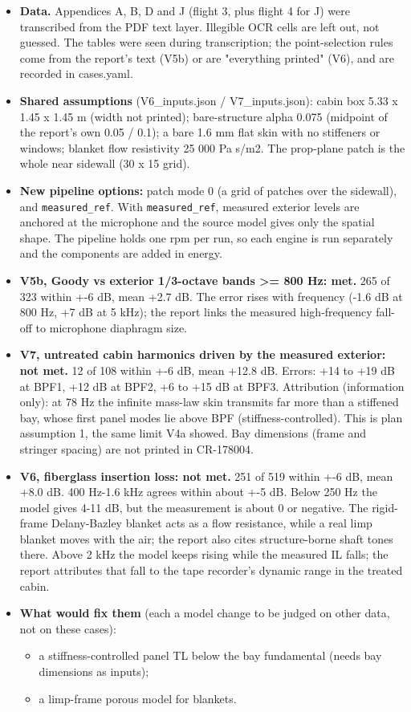\documentclass[10pt,a4paper]{article}
\begin{document}
\begin{itemize}
\item \textbf{Data.} Appendices A, B, D and J (flight 3, plus flight 4 for J) were transcribed from the PDF text layer. Illegible OCR cells are left out, not guessed. The tables were seen during transcription; the point-selection rules come from the report's text (V5b) or are "everything printed" (V6), and are recorded in cases.yaml.
\item \textbf{Shared assumptions} (V6\_inputs.json / V7\_inputs.json): cabin box 5.33 x 1.45 x 1.45 m (width not printed); bare-structure alpha 0.075 (midpoint of the report's own 0.05 / 0.1); a bare 1.6 mm flat skin with no stiffeners or windows; blanket flow resistivity 25 000 Pa s/m2. The prop-plane patch is the whole near sidewall (30 x 15 grid).
\item \textbf{New pipeline options:} patch mode 0 (a grid of patches over the sidewall), and \texttt{measured\_\allowbreak{}ref}. With \texttt{measured\_\allowbreak{}ref}, measured exterior levels are anchored at the microphone and the source model gives only the spatial shape. The pipeline holds one rpm per run, so each engine is run separately and the components are added in energy.
\item \textbf{V5b, Goody vs exterior 1/3-octave bands >= 800 Hz: met.} 265 of 323 within +-6 dB, mean +2.7 dB. The error rises with frequency (-1.6 dB at 800 Hz, +7 dB at 5 kHz); the report links the measured high-frequency fall-off to microphone diaphragm size.
\item \textbf{V7, untreated cabin harmonics driven by the measured exterior: not met.} 12 of 108 within +-6 dB, mean +12.8 dB. Errors: +14 to +19 dB at BPF1, +12 dB at BPF2, +6 to +15 dB at BPF3. Attribution (information only): at 78 Hz the infinite mass-law skin transmits far more than a stiffened bay, whose first panel modes lie above BPF (stiffness-controlled). This is plan assumption 1, the same limit V4a showed. Bay dimensions (frame and stringer spacing) are not printed in CR-178004.
\item \textbf{V6, fiberglass insertion loss: not met.} 251 of 519 within +-6 dB, mean +8.0 dB. 400 Hz-1.6 kHz agrees within about +-5 dB. Below 250 Hz the model gives 4-11 dB, but the measurement is about 0 or negative. The rigid-frame Delany-Bazley blanket acts as a flow resistance, while a real limp blanket moves with the air; the report also cites structure-borne shaft tones there. Above 2 kHz the model keeps rising while the measured IL falls; the report attributes that fall to the tape recorder's dynamic range in the treated cabin.
\item \textbf{What would fix them} (each a model change to be judged on other data, not on these cases):
\begin{itemize}
\item a stiffness-controlled panel TL below the bay fundamental (needs bay dimensions as inputs);
\item a limp-frame porous model for blankets.
\end{itemize}
\end{itemize}
\end{document}

